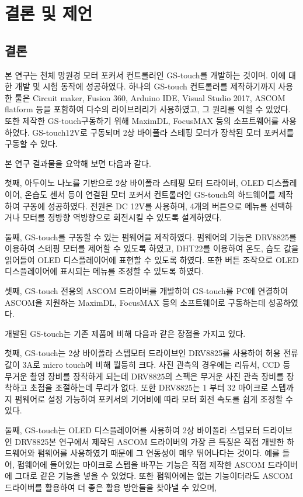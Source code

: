 \section{결론 및 제언}

\subsection{결론}
	
본 연구는 천체 망원경 모터 포커서 컨트롤러인 GS-touch를 개발하는 것이며. 이에 대한 개발 및 시험 동작에 성공하였다. 하나의 GS-touch 컨트롤러를 제작하기까지 사용한 툴은 Circuit maker, Fusion 360, Arduino IDE, Visual Studio 2017, ASCOM flatform 등을 포함하여 다수의 라이브러리가 사용하였고, 그 원리를 익힐 수 있었다. 또한 제작한 GS-touch\를 구동하기 위해 MaximDL, FocusMAX 등의 소프트웨어를 사용하였다. GS-touch\는 $12 \textrm{V}$로 구동되며 2상 바이폴라 스테핑 모터가 장착된 모터 포커서를 구동할 수 있다. 

본 연구 결과물을 요약해 보면 다음과 같다. 

첫째, 아두이노 나노를 기반으로 2상 바이폴라 스테핑 모터 드라이버, OLED 디스플레이어, 온습도 센서 등이 연결된 모터 포커서 컨트롤러인 GS-touch의 하드웨어를 제작하여 구동에 성공하였다. 전원은 DC 12V를 사용하며, 4개의 버튼으로 메뉴를 선택하거나 모터를 정방향 역방향으로 회전시킬 수 있도록 설계하였다.

둘째, GS-touch를 구동할 수 있는 펌웨어을 제작하였다. 펌웨어의 기능은 DRV8825를 이용하여 스테핑 모터를 제어할 수 있도록 하였고, DHT22를 이용하여 온도, 습도 값을 읽어들여 OLED 디스플레이어에 표현할 수 있도록 하였다. 또한 버튼 조작으로 OLED 디스플레이어에 표시되는 메뉴를 조정할 수 있도록 하였다. 

셋째, GS-touch 전용의 ASCOM 드라이버를 개발하여 GS-touch를 PC에 연결하여 ASCOM을 지원하는 MaximDL, FocusMAX 등의 소프트웨어로 구동하는데 성공하였다.

개발된 GS-touch는 기존 제품에 비해 다음과 같은 장점을 가지고 있다. 

첫째, GS-touch는 2상 바이폴라 스텝모터 드라이브인 DRV8825를 사용하여 허용 전류 값이 $3 \textrm{A}$로 micro touch에 비해 월등히 크다. 사진 관측의 경우에는 리듀서, CCD 등 무거운 촬영 장비를 장착하게 되는데 DRV8825의 스펙은 무거운 사진 관측 장비를 장착하고 초점을 조절하는데 무리가 없다. 또한 DRV8825는 1 부터 32 마이크로 스텝까지 펌웨어로 설정 가능하여 포커서의 기어비에 따라 모터 회전 속도를 쉽게 조정할 수 있다. 

둘째, GS-touch는 OLED 디스플레이어를 사용하여 2상 바이폴라 스텝모터 드라이브인 DRV8825본 연구에서 제작된 ASCOM 드라이버의 가장 큰 특징은 직접 개발한 하드웨어와 펌웨어를 사용하였기 때문에 그 연동성이 매우 뛰어나다는 것이다. 예를 들어, 펌웨어에 들어있는 마이크로 스텝을 바꾸는 기능은 직접 제작한 ASCOM 드라이버에 그대로 같은 기능을 넣을 수 있었다. 또한 펌웨어에는 없는 기능이더라도 ASCOM 드라이버를 활용하여 더 좋은 활용 방안들을 찾아낼 수 있으며, 

